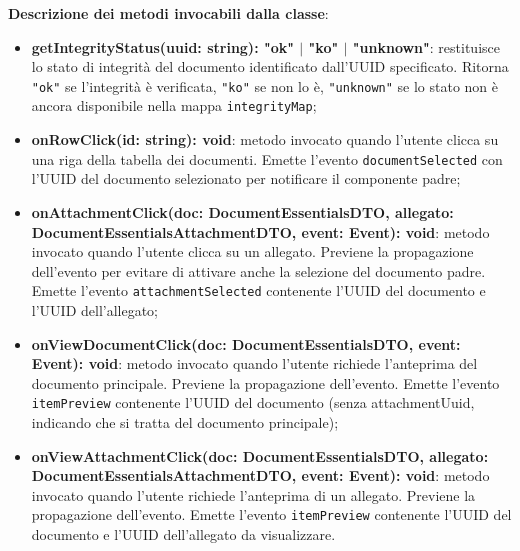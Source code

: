 \documentclass[a4paper,12pt]{article}
\begin{document}
{{{{                \noindent \textbf{Descrizione dei metodi invocabili dalla classe}:
                \begin{itemize}
                    \item \textbf{getIntegrityStatus(uuid: string): "ok" $|$ "ko" $|$ "unknown"}: restituisce lo stato di integrità del documento identificato dall'UUID specificato. Ritorna \texttt{"ok"} se l'integrità è verificata, \texttt{"ko"} se non lo è, \texttt{"unknown"} se lo stato non è ancora disponibile nella mappa \texttt{integrityMap};
                    \item \textbf{onRowClick(id: string): void}: metodo invocato quando l'utente clicca su una riga della tabella dei documenti. Emette l'evento \texttt{documentSelected} con l'UUID del documento selezionato per notificare il componente padre;
                    \item \textbf{onAttachmentClick(doc: DocumentEssentialsDTO, allegato: DocumentEssentialsAttachmentDTO, event: Event): void}: metodo invocato quando l'utente clicca su un allegato. Previene la propagazione dell'evento per evitare di attivare anche la selezione del documento padre. Emette l'evento \texttt{attachmentSelected} contenente l'UUID del documento e l'UUID dell'allegato;
                    \item \textbf{onViewDocumentClick(doc: DocumentEssentialsDTO, event: Event): void}: metodo invocato quando l'utente richiede l'anteprima del documento principale. Previene la propagazione dell'evento. Emette l'evento \texttt{itemPreview} contenente l'UUID del documento (senza attachmentUuid, indicando che si tratta del documento principale);
                    \item \textbf{onViewAttachmentClick(doc: DocumentEssentialsDTO, allegato: DocumentEssentialsAttachmentDTO, event: Event): void}: metodo invocato quando l'utente richiede l'anteprima di un allegato. Previene la propagazione dell'evento. Emette l'evento \texttt{itemPreview} contenente l'UUID del documento e l'UUID dell'allegato da visualizzare.
                \end{itemize}
}}}}
\end{document}
